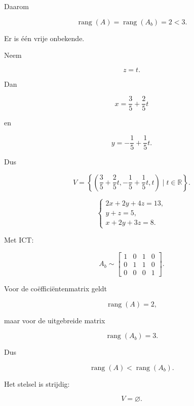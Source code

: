 \documentclass{ximera}
\begin{document}
\begin{oefening}{\oefB\ESS}
\begin{question}
\begin{oplossing}
Daarom

\[
\operatorname{rang}(A)
=
\operatorname{rang}(A_b)
=
2<3.
\]

Er is één vrije onbekende.

Neem

\[
z=t.
\]

Dan

\[
x=\frac35+\frac25t
\]

en

\[
y=-\frac15+\frac15t.
\]

Dus

\[
V=
\left\{
\left(
\frac35+\frac25t,
-\frac15+\frac15t,
t
\right)
\mid t\in\mathbb{R}
\right\}.
\]

\end{oplossing}

\end{question}


\begin{question}

\[
\begin{cases}
2x+2y+4z=13,\\
y+z=5,\\
x+2y+3z=8.
\end{cases}
\]

\begin{oplossing}

Met ICT:

\[
A_b
\sim
\left[
\begin{array}{ccc|c}
1&0&1&0\\
0&1&1&0\\
0&0&0&1
\end{array}
\right].
\]

Voor de coëfficiëntenmatrix geldt

\[
\operatorname{rang}(A)=2,
\]

maar voor de uitgebreide matrix

\[
\operatorname{rang}(A_b)=3.
\]

Dus

\[
\operatorname{rang}(A)
<
\operatorname{rang}(A_b).
\]

Het stelsel is strijdig:

\[
V=\varnothing.
\]

\end{oplossing}

\end{question}

\end{oefening}
\end{document}
